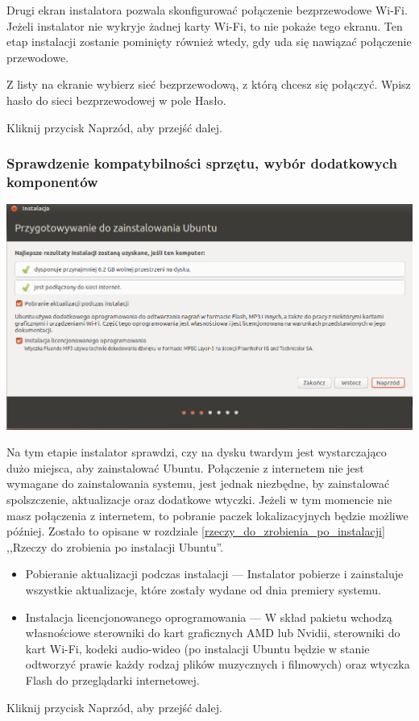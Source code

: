 Drugi ekran instalatora pozwala skonfigurować połączenie bezprzewodowe Wi-Fi. Jeżeli instalator nie wykryje żadnej karty Wi-Fi, to nie pokaże tego ekranu. Ten etap instalacji zostanie pominięty również wtedy, gdy uda się nawiązać połączenie przewodowe.

Z listy na ekranie wybierz sieć bezprzewodową, z którą chcesz się połączyć. Wpisz hasło do sieci bezprzewodowej w pole \textcolor{ubuntu_orange}{Hasło}.
\begin{flushright}
Kliknij przycisk \textcolor{ubuntu_orange}{Naprzód}, aby przejść dalej.
\end{flushright}
\clearpage
\subsubsection{Sprawdzenie kompatybilności sprzętu, wybór dodatkowych komponentów}
\begin{center}
        \includegraphics[width=\linewidth]{images/instalator_wymagania.png}
\end{center}

Na tym etapie instalator sprawdzi, czy na dysku twardym jest wystarczająco dużo miejsca, aby zainstalować Ubuntu. Połączenie z internetem nie jest wymagane do zainstalowania systemu, jest jednak niezbędne, by zainstalować spolszczenie, aktualizacje oraz dodatkowe wtyczki. Jeżeli w tym momencie nie masz połączenia z internetem, to pobranie paczek lokalizacyjnych będzie możliwe później. Zostało to opisane w rozdziale \ref{rzeczy_do_zrobienia_po_instalacji} ,,Rzeczy do zrobienia po instalacji Ubuntu''.
\begin{itemize}
\item \textcolor{ubuntu_orange}{Pobieranie aktualizacji podczas instalacji} --- Instalator pobierze i zainstaluje wszystkie aktualizacje, które zostały wydane od dnia premiery systemu.
\item \textcolor{ubuntu_orange}{Instalacja licencjonowanego oprogramowania} --- W skład pakietu wchodzą własnościowe sterowniki do kart graficznych AMD lub Nvidii, sterowniki do kart Wi-Fi, kodeki audio-wideo (po instalacji Ubuntu będzie w stanie odtworzyć prawie każdy rodzaj plików muzycznych i filmowych) oraz wtyczka Flash do przeglądarki internetowej.
\end{itemize}
\begin{flushright}
Kliknij przycisk \textcolor{ubuntu_orange}{Naprzód}, aby przejść dalej.
\end{flushright}
\clearpage

